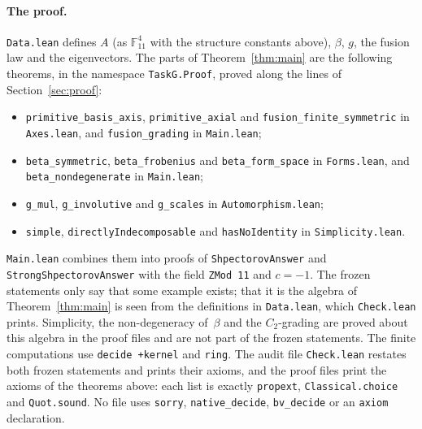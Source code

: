 \documentclass[11pt]{article}
\theoremstyle{remark}
\newcommand{\F}{\mathbb{F}}
\begin{document}
\paragraph{The proof.}
\texttt{Data.lean} defines $A$ (as $\F_{11}^4$ with the structure constants
above), $\beta$, $g$, the fusion law and the eigenvectors. The parts of
Theorem~\ref{thm:main} are the following theorems, in the namespace
\texttt{TaskG.Proof}, proved along the lines of Section~\ref{sec:proof}:
\begingroup\raggedright
\begin{itemize}
\item[(a)] \texttt{primitive\_basis\_axis}, \texttt{primitive\_axial} and
\texttt{fusion\_finite\_symmetric} in \texttt{Axes.lean}, and
\texttt{fusion\_grading} in \texttt{Main.lean};
\item[(b)] \texttt{beta\_symmetric}, \texttt{beta\_frobenius} and
\texttt{beta\_form\_space} in \texttt{Forms.lean}, and
\texttt{beta\_nondegenerate} in \texttt{Main.lean};
\item[(c)] \texttt{g\_mul}, \texttt{g\_involutive} and \texttt{g\_scales} in
\texttt{Automorphism.lean};
\item[(d)] \texttt{simple}, \texttt{directlyIndecomposable} and
\texttt{hasNoIdentity} in \texttt{Simplicity.lean}.
\end{itemize}
\endgroup
\texttt{Main.lean} combines them into proofs of \texttt{ShpectorovAnswer} and
\texttt{StrongShpectorovAnswer} with the field \texttt{ZMod 11} and $c=-1$.
The frozen statements only say that some example exists; that it is the
algebra of Theorem~\ref{thm:main} is seen from the definitions in
\texttt{Data.lean}, which \texttt{Check.lean} prints. Simplicity, the
non-degeneracy of~$\beta$ and the $C_2$-grading are proved about this algebra
in the proof files and are not part of the frozen statements. The finite
computations use \texttt{decide +kernel} and \texttt{ring}. The audit file
\texttt{Check.lean} restates both frozen statements and prints their axioms,
and the proof files print the axioms of the theorems above: each list is
exactly \texttt{propext}, \texttt{Classical.choice} and \texttt{Quot.sound}. No file
uses \texttt{sorry}, \texttt{native\_decide}, \texttt{bv\_decide} or an
\texttt{axiom} declaration.
\end{document}
